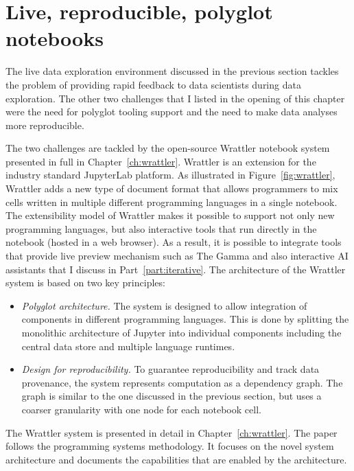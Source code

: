 \documentclass[fleqn,11pt]{report}
\theoremstyle{definition}
\newenvironment{nitemize}
{ \vspace{-0.4em}
  \begin{itemize}
    \setlength{\itemsep}{5pt}
    \setlength{\parskip}{0pt}
    \setlength{\parsep}{0pt} }
{ \end{itemize}
  \vspace{-0.4em} }
\begin{document}
\section{Live, reproducible, polyglot notebooks}

The live data exploration environment discussed in the previous section tackles the problem of
providing rapid feedback to data scientists during data exploration. The other two challenges that
I listed in the opening of this chapter were the need for polyglot tooling support and the need
to make data analyses more reproducible.

The two challenges are tackled by the open-source Wrattler notebook system presented in full in
Chapter~\ref{ch:wrattler}. Wrattler is an extension for the industry standard JupyterLab platform.
As illustrated in Figure~\ref{fig:wrattler}, Wrattler adds a new type of document format that
allows programmers to mix cells written in multiple different programming languages in a single
notebook. The extensibility model of Wrattler makes it possible to support not only new programming
languages, but also interactive tools that run directly in the notebook (hosted in a web browser).
As a result, it is possible to integrate tools that provide live preview mechanism such as
The Gamma and also interactive AI assistants that I discuss in Part~\ref{part:iterative}.
The architecture of the Wrattler system is based on two key principles:

\begin{nitemize}
\item \emph{Polyglot architecture.} The system is designed to allow integration of components in
  different programming languages. This is done by splitting the monolithic architecture of
  Jupyter into individual components including the central data store and multiple language runtimes.

\item \emph{Design for reproducibility.} To guarantee reproducibility and track data provenance,
  the system represents computation as a dependency graph. The graph is similar to the one discussed
  in the previous section, but uses a coarser granularity with one node for each notebook cell.
\end{nitemize}

The Wrattler system is presented in detail in Chapter~\ref{ch:wrattler}. The paper follows the
programming systems methodology. It focuses on the novel system architecture and documents the
capabilities that are enabled by the architecture.
\end{document}
